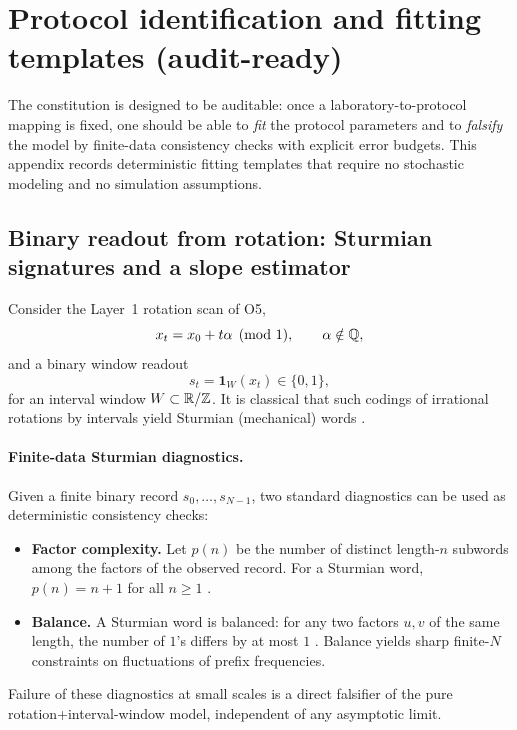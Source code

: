 \section{Protocol identification and fitting templates (audit-ready)}
\label{app:protocol_fitting}

The constitution is designed to be auditable: once a laboratory-to-protocol mapping is fixed, one should be able to \emph{fit} the protocol parameters and to \emph{falsify} the model by finite-data consistency checks with explicit error budgets.
This appendix records deterministic fitting templates that require no stochastic modeling and no simulation assumptions.

\subsection{Binary readout from rotation: Sturmian signatures and a slope estimator}
\label{app:sturmian_fitting}

Consider the Layer~1 rotation scan of O5,
\[
x_t=x_0+t\alpha\pmod 1,\qquad \alpha\notin\mathbb{Q},
\]
and a binary window readout
\[
s_t=\mathbf{1}_W(x_t)\in\{0,1\},
\]
for an interval window $W\subset\mathbb{R}/\mathbb{Z}$.
It is classical that such codings of irrational rotations by intervals yield Sturmian (mechanical) words \cite{MorseHedlund1940,Lothaire2002}.

\paragraph{Finite-data Sturmian diagnostics.}
Given a finite binary record $s_0,\ldots,s_{N-1}$, two standard diagnostics can be used as deterministic consistency checks:
\begin{itemize}
  \item \textbf{Factor complexity.}
  Let $p(n)$ be the number of distinct length-$n$ subwords among the factors of the observed record.
  For a Sturmian word, $p(n)=n+1$ for all $n\ge 1$ \cite{MorseHedlund1940,Lothaire2002}.
  \item \textbf{Balance.}
  A Sturmian word is balanced: for any two factors $u,v$ of the same length, the number of $1$'s differs by at most $1$ \cite{Lothaire2002}.
  Balance yields sharp finite-$N$ constraints on fluctuations of prefix frequencies.
\end{itemize}
Failure of these diagnostics at small scales is a direct falsifier of the pure rotation+interval-window model, independent of any asymptotic limit.

